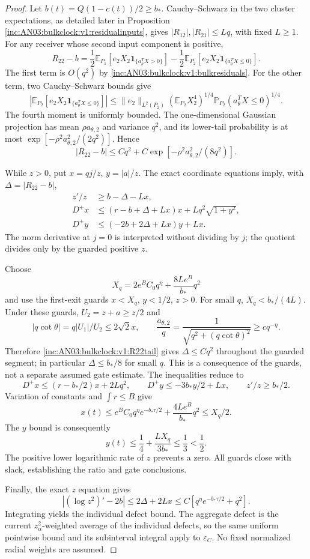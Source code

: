 \documentclass[11pt]{article}
\theoremstyle{remark}\newtheorem{remark}[theorem]{Remark}
\newcommand{\E}{\mathbb E}\newcommand{\dd}{\,d}
\begin{document}
\begin{proof}
Let $b(t)=Q(1-c(t))/2\ge b_*$. Cauchy--Schwarz in the two cluster expectations, as detailed later in Proposition \ref{inc:AN03:bulkclock:v1:residualinputs}, gives $|R_{12}|,|R_{21}|\le Lq$, with fixed $L\ge1$.
For any receiver whose second input component is positive,
\[
 R_{22}-b=\frac12\E_{P_1}[e_2X_2\mathbf1_{\{a_\theta^TX>0\}}]
 -\frac12\E_{P_2}[e_2X_2\mathbf1_{\{a_\theta^TX\le0\}}].
\]
The first term is $O(q^2)$ by \eqref{inc:AN03:bulkclock:v1:bulkresiduals}. For the other term, two Cauchy--Schwarz bounds give
\[
 |\E_{P_2}[e_2X_2\mathbf1_{\{a_\theta^TX\le0\}}]|
 \le \|e_2\|_{L^2(P_2)}(\E_{P_2}X_2^4)^{1/4}
       \mathbb P_{P_2}(a_\theta^TX\le0)^{1/4}.
\]
The fourth moment is uniformly bounded. The one-dimensional Gaussian projection has mean $\rho a_{\theta,2}$ and variance $q^2$, and its lower-tail probability is at most $\exp[-\rho^2a_{\theta,2}^2/(2q^2)]$. Hence
\begin{equation}\label{inc:AN03:bulkclock:v1:R22tail}
 |R_{22}-b|\le Cq^2+C\exp[-\rho^2a_{\theta,2}^2/(8q^2)].
\end{equation}

While $z>0$, put $x=qj/z$, $y=|a|/z$. The exact coordinate equations imply, with $\Delta=|R_{22}-b|$,
\begin{align*}
 z'/z&\ge b-\Delta-Lx,\\
 D^+x&\le(r-b+\Delta+Lx)x+Lq^2\sqrt{1+y^2},\\
 D^+y&\le(-2b+2\Delta+Lx)y+Lx.
\end{align*}
The norm derivative at $j=0$ is interpreted without dividing by $j$; the quotient divides only by the guarded positive $z$.

Choose
\[
 X_q=2e^BC_0q^\eta+\frac{8Le^B}{b_*}q^2
\]
and use the first-exit guards $x<X_q$, $y<1/2$, $z>0$. For small $q$, $X_q<b_*/(4L)$. Under these guards, $U_2=z+a\ge z/2$ and
\[
 |q\cot\theta|=q|U_1|/U_2\le2\sqrt2x,\qquad
 \frac{a_{\theta,2}}q=\frac1{\sqrt{q^2+(q\cot\theta)^2}}
 \ge c q^{-\eta}.
\]
Therefore \eqref{inc:AN03:bulkclock:v1:R22tail} gives $\Delta\le Cq^2$ throughout the guarded segment; in particular $\Delta\le b_*/8$ for small $q$. This is a consequence of the guards, not a separate assumed gate estimate. The inequalities reduce to
\[
 D^+x\le(r-b_*/2)x+2Lq^2,\qquad
 D^+y\le-3b_*y/2+Lx,\qquad z'/z\ge b_*/2.
\]
Variation of constants and $\int r\le B$ give
\[
 x(t)\le e^BC_0q^\eta e^{-b_*\tau/2}
                +\frac{4Le^B}{b_*}q^2\le X_q/2.
\]
The $y$ bound is consequently
\[
 y(t)\le\frac14+\frac{LX_q}{3b_*}\le\frac13<\frac12.
\]
The positive lower logarithmic rate of $z$ prevents a zero. All guards close with slack, establishing the ratio and gate conclusions.

Finally, the exact $z$ equation gives
\[
 |(\log z^2)'-2b|\le2\Delta+2Lx
 \le C[q^\eta e^{-b_*\tau/2}+q^2].
\]
Integrating yields the individual defect bound. The aggregate defect is the current $z_\alpha^2$-weighted average of the individual defects, so the same uniform pointwise bound and its subinterval integral apply to $\varepsilon_C$. No fixed normalized radial weights are assumed.
\end{proof}
\end{document}
